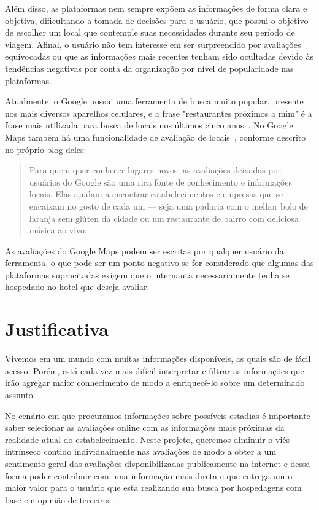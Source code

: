 Além disso, as plataformas nem sempre expõem as informações de forma clara e objetiva, dificultando a tomada de decisões para o usuário, que possui o objetivo de escolher um local que contemple suas necessidades durante seu período de viagem. Afinal, o usuário não tem interesse em ser surpreendido por avaliações equivocadas ou que as informações mais recentes tenham sido ocultadas devido às tendências negativas por conta da organização por nível de popularidade nas plataformas.

Atualmente, o Google possui uma ferramenta de busca muito popular, presente nos mais diversos aparelhos celulares, e a frase "restaurantes próximos a mim" é a frase mais utilizada para busca de locais nos últimos cinco anos~\cite{li20213}. No Google Maps também há uma funcionalidade de avaliação de locais~\cite{googleMaps2022Blog}, conforme descrito no próprio blog deles:

\begin{quote}
	Para quem quer conhecer lugares novos, as avaliações deixadas por usuários do Google são uma rica fonte de conhecimento e informações locais. Elas ajudam a encontrar estabelecimentos e empresas que se encaixam no gosto de cada um — seja uma padaria com o melhor bolo de laranja sem glúten da cidade ou um restaurante de bairro com deliciosa música ao vivo.
\end{quote}

As avaliações do Google Maps podem ser escritas por qualquer usuário da ferramenta, o que pode ser um ponto negativo se for considerado que algumas das plataformas supracitadas exigem que o internauta necessariamente tenha se hospedado no hotel que deseja avaliar.

\section{Justificativa}

Vivemos em um mundo com muitas informações disponíveis, as quais são de fácil acesso. Porém, está cada vez mais difícil interpretar e filtrar as informações que irão agregar maior conhecimento de modo a enriquecê-lo sobre um determinado assunto.

No cenário em que procuramos informações sobre possíveis estadias é importante saber selecionar as avaliações online com as informações mais próximas da realidade atual do estabelecimento. Neste projeto, queremos diminuir o viés intrínseco contido individualmente nas avaliações de modo a obter a um sentimento geral das avaliações disponibilizadas publicamente na internet e dessa forma poder contribuir com uma informação mais direta e que entrega um o maior valor para o usuário que esta realizando sua busca por hospedagens com base em opinião de terceiros.

